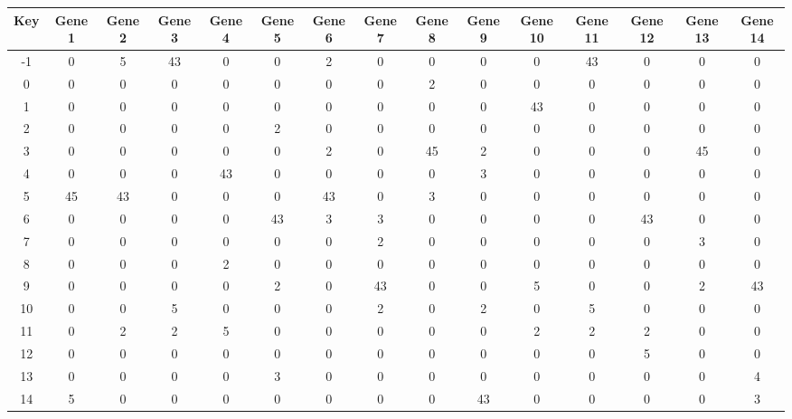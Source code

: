 \begin{tabular}{|c|c|c|c|c|c|c|c|c|c|c|c|c|c|c|}
\hline
Key & Gene 1 & Gene 2 & Gene 3 & Gene 4 & Gene 5 & Gene 6 & Gene 7 & Gene 8 & Gene 9 & Gene 10 & Gene 11 & Gene 12 & Gene 13 & Gene 14 \\
\hline
-1 & 0 & 5 & 43 & 0 & 0 & 2 & 0 & 0 & 0 & 0 & 43 & 0 & 0 & 0 \\
0 & 0 & 0 & 0 & 0 & 0 & 0 & 0 & 2 & 0 & 0 & 0 & 0 & 0 & 0 \\
1 & 0 & 0 & 0 & 0 & 0 & 0 & 0 & 0 & 0 & 43 & 0 & 0 & 0 & 0 \\
2 & 0 & 0 & 0 & 0 & 2 & 0 & 0 & 0 & 0 & 0 & 0 & 0 & 0 & 0 \\
3 & 0 & 0 & 0 & 0 & 0 & 2 & 0 & 45 & 2 & 0 & 0 & 0 & 45 & 0 \\
4 & 0 & 0 & 0 & 43 & 0 & 0 & 0 & 0 & 3 & 0 & 0 & 0 & 0 & 0 \\
5 & 45 & 43 & 0 & 0 & 0 & 43 & 0 & 3 & 0 & 0 & 0 & 0 & 0 & 0 \\
6 & 0 & 0 & 0 & 0 & 43 & 3 & 3 & 0 & 0 & 0 & 0 & 43 & 0 & 0 \\
7 & 0 & 0 & 0 & 0 & 0 & 0 & 2 & 0 & 0 & 0 & 0 & 0 & 3 & 0 \\
8 & 0 & 0 & 0 & 2 & 0 & 0 & 0 & 0 & 0 & 0 & 0 & 0 & 0 & 0 \\
9 & 0 & 0 & 0 & 0 & 2 & 0 & 43 & 0 & 0 & 5 & 0 & 0 & 2 & 43 \\
10 & 0 & 0 & 5 & 0 & 0 & 0 & 2 & 0 & 2 & 0 & 5 & 0 & 0 & 0 \\
11 & 0 & 2 & 2 & 5 & 0 & 0 & 0 & 0 & 0 & 2 & 2 & 2 & 0 & 0 \\
12 & 0 & 0 & 0 & 0 & 0 & 0 & 0 & 0 & 0 & 0 & 0 & 5 & 0 & 0 \\
13 & 0 & 0 & 0 & 0 & 3 & 0 & 0 & 0 & 0 & 0 & 0 & 0 & 0 & 4 \\
14 & 5 & 0 & 0 & 0 & 0 & 0 & 0 & 0 & 43 & 0 & 0 & 0 & 0 & 3 \\
\hline
\end{tabular}